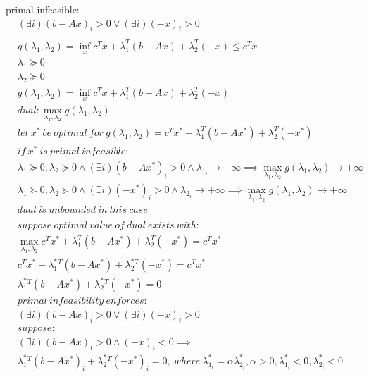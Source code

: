 \documentclass[12pt,letter]{article}
\begin{document}
\begin{enumerate}
\begin{itemize}
  primal infeasible:
    \begin{align*}
      &(\exists i) (b-Ax)_i > 0 \vee (\exists i) (-x)_i > 0\\
      \\
      &g(\lambda_1,\lambda_2) = \inf_x c^Tx +\lambda_1^T(b-Ax) + \lambda_2^T(-x) \leq c^Tx\\
      &\lambda_1 \succeq 0\\
      &\lambda_2 \succeq 0\\
      &g(\lambda_1,\lambda_2) = \inf_x c^Tx +\lambda_1^T(b-Ax) + \lambda_2^T(-x)\\
      &dual: \max_{\lambda_1,\lambda_2} g(\lambda_1,\lambda_2)\\
      &let\ x^*\ be\ optimal\ for\ g(\lambda_1,\lambda_2) = c^Tx^* +\lambda_1^T(b-Ax^*) + \lambda_2^T(-x^*)\\
      &if\ x^*\ is\ primal\ infeasible:\\
      &\lambda_1 \succeq 0, \lambda_2 \succeq 0 \wedge (\exists i) (b-Ax^*)_i > 0 \wedge \lambda_{1_i} \to +\infty \implies \max_{\lambda_1, \lambda_2} g(\lambda_1,\lambda_2) \to +\infty\\
      &\lambda_1 \succeq 0, \lambda_2 \succeq 0 \wedge (\exists i) (-x^*)_i > 0 \wedge \lambda_{2_i} \to +\infty \implies \max_{\lambda_1, \lambda_2} g(\lambda_1,\lambda_2) \to +\infty\\
      &dual\ is\ unbounded\ in\ this\ case\\
      \\
      &suppose\ optimal\ value\ of\ dual\ exists\ with:\\
      &\max_{\lambda_1,\lambda_2} c^Tx^* +\lambda_1^T(b-Ax^*) + \lambda_2^T(-x^*) = c^Tx^*\\
      &c^Tx^* +\lambda_1^*^T(b-Ax^*) + \lambda_2^*^T(-x^*) = c^Tx^*\\
      &\lambda_1^*^T(b-Ax^*) + \lambda_2^*^T(-x^*) = 0\\
      &primal\ infeasibility\ enforces:\\
      &(\exists i)(b-Ax)_i > 0 \vee (\exists i)(-x)_i > 0\\
      &suppose:\\
      &(\exists i)(b-Ax)_i > 0 \wedge (-x)_i < 0 \implies\\
      &\lambda_1^*^T(b-Ax^*)_i + \lambda_2^*^T(-x^*)_i = 0,\ where\ \lambda_{1_i}^* = \alpha \lambda_{2_i}^*, \alpha > 0, \lambda_{1_i}^* < 0, \lambda_{2_i}^* < 0\\

\end{align*}
\end{itemize}
\end{enumerate}
\end{document}
